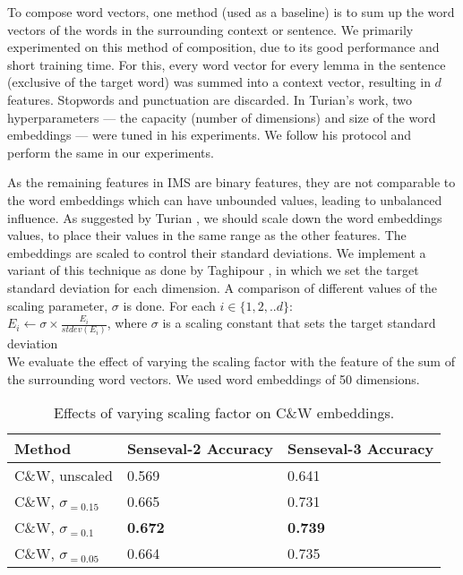 To compose word vectors, one method (used as a baseline) is to sum up
the word vectors of the words in the surrounding context or
sentence. We primarily experimented on this method of composition, due
to its good performance and short training time. For this, every word
vector for every lemma in the sentence (exclusive of the target word)
was summed into a context vector, resulting in $d$ features. Stopwords
and punctuation are discarded. In Turian's
 work, two hyperparameters ---
the capacity (number of dimensions) and size of the word embeddings
--- were tuned in his experiments. We follow his protocol and perform
the same in our experiments.

As the remaining features in IMS are binary features, they are not
comparable to the word embeddings which can have unbounded values,
leading to unbalanced influence.  As suggested by Turian
, we should scale down the word
embeddings values, to place their values in the same range as the
other features. The embeddings are scaled to control their standard
deviations. We implement a variant of this technique as done by
Taghipour , in which we set the target standard
deviation for each dimension. A comparison of different values of the
scaling parameter, $\sigma$ is done. For each $i \in \{1, 2, .. d\}$:
\\

$E_{i} \leftarrow \sigma \times \frac{E_{i}}{stdev(E_{i})} $, where
$\sigma$ is a scaling constant that sets the target standard deviation
\\

We evaluate the effect of varying the scaling factor with the feature
of the sum of the surrounding word vectors. We used word embeddings of 50
dimensions.

\begin{table}[th]
	\caption{Effects of varying scaling factor on C\&W embeddings.}
	\label{table:wordembeddings-accuracy}
	\begin{center}
		\begin{tabular}{| p{7cm} | p{4cm} | p{4cm} |}
			\hline
			Method & Senseval-2 Accuracy & Senseval-3 Accuracy \\
			\hline
			C\&W, unscaled & 0.569 & 0.641 \\
			\hline
			C\&W, $\sigma _{=0.15}$ & 0.665 & 0.731 \\
			\hline
			C\&W, $\sigma _{=0.1}$ & {\bf0.672} & {\bf0.739} \\
			\hline
			C\&W, $\sigma _{=0.05}$ & 0.664 & 0.735 \\
			\hline
		\end{tabular}
	\end{center}
\end{table}

